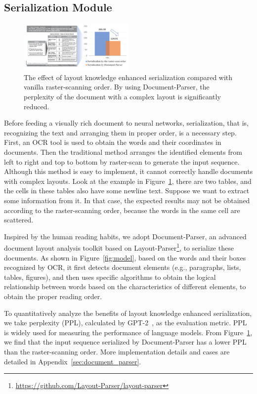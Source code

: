 \documentclass[11pt]{article}
\begin{document}
\subsection{Serialization Module}
\label{sec:document-parser}

\begin{figure}[t]
    \includegraphics[width=0.5\textwidth]{figures/parser.pdf}
    \caption{The effect of layout knowledge enhanced serialization compared with vanilla raster-scanning order. By using Document-Parser, the perplexity of the document with a complex layout is significantly reduced.}
    \label{fig:parser_example}
\end{figure}

Before feeding a visually rich document to neural networks, serialization, that is, recognizing the text and arranging them in proper order, is a necessary step.
First, an OCR tool is used to obtain the words and their coordinates in documents. Then the traditional method arranges the identified elements from left to right and top to bottom by raster-scan to generate the input sequence.
Although this method is easy to implement, it cannot correctly handle documents with complex layouts.
Look at the example in Figure~\ref{fig:parser_example}, there are two tables, and the cells in these tables also have some newline text. Suppose we want to extract some information from it. In that case, the expected results may not be obtained according to the raster-scanning order, because the words in the same cell are scattered.

Inspired by the human reading habits, we adopt Document-Parser, an advanced document layout analysis toolkit based on Layout-Parser\footnote{\url{https://github.com/Layout-Parser/layout-parser}}, to serialize these documents.
As shown in Figure~\ref{fig:model}, based on the words and their boxes recognized by OCR, it first detects document elements (e.g., paragraphs, lists, tables, figures), and then uses specific algorithms to obtain the logical relationship between words based on the characteristics of different elements, to obtain the proper reading order.

To quantitatively analyze the benefits of layout knowledge enhanced serialization, we take perplexity (PPL), calculated by GPT-2~\cite{radford2019language}, as the evaluation metric. PPL is widely used for measuring the performance of language models. 
From Figure~\ref{fig:parser_example}, we find that the input sequence serialized by Document-Parser has a lower PPL  than the raster-scanning order. More implementation details and cases are detailed in Appendix~\ref{sec:document_parser}.
\end{document}
